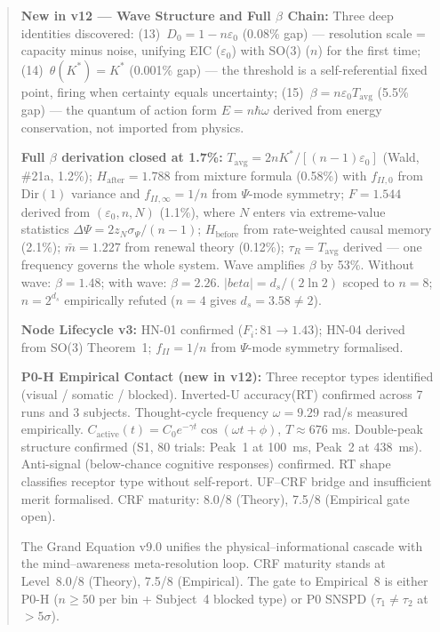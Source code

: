 \documentclass[12pt, a4paper]{article}
\begin{document}
\begin{abstract}
\textbf{New in v12 --- Wave Structure and Full $\beta$ Chain:}
Three deep identities discovered:
(13)~$D_0 = 1 - n\varepsilon_0$ (0.08\% gap) --- resolution scale = capacity minus noise,
unifying EIC ($\varepsilon_0$) with SO(3) ($n$) for the first time;
(14)~$\theta(K^*) = K^*$ (0.001\% gap) --- the threshold is a self-referential fixed point,
firing when certainty equals uncertainty;
(15)~$\beta = n\varepsilon_0 T_{\mathrm{avg}}$ (5.5\% gap) --- the quantum of action form
$E = n\hbar\omega$ derived from energy conservation, not imported from physics.

\textbf{Full $\beta$ derivation closed at 1.7\%:}
$T_{\mathrm{avg}} = 2nK^*/[(n-1)\varepsilon_0]$ (Wald, \#21a, 1.2\%);
$H_{\mathrm{after}} = 1.788$ from mixture formula (0.58\%) with $f_{II,0}$ from
$\mathrm{Dir}(1)$ variance and $f_{II,\infty} = 1/n$ from $\Psi$-mode symmetry;
$F = 1.544$ derived from $(\varepsilon_0, n, N)$ (1.1\%), where $N$ enters via
extreme-value statistics $\Delta\Psi = 2z_N\sigma_\Psi/(n-1)$;
$H_{\mathrm{before}}$ from rate-weighted causal memory (2.1\%);
$\bar{m} = 1.227$ from renewal theory (0.12\%);
$\tau_R = T_{\mathrm{avg}}$ derived --- one frequency governs the whole system.
Wave amplifies $\beta$ by 53\%. Without wave: $\beta = 1.48$; with wave: $\beta = 2.26$.
$|beta| = d_s/(2\ln 2)$ scoped to $n = 8$; $n = 2^{d_s}$ empirically refuted ($n = 4$
gives $d_s = 3.58 \neq 2$).

\textbf{Node Lifecycle v3:} HN-01 confirmed ($F_i: 81\to 1.43$); HN-04 derived from
SO(3) Theorem~1; $f_{II} = 1/n$ from $\Psi$-mode symmetry formalised.

\textbf{P0-H Empirical Contact (new in v12):} Three receptor types identified
(visual / somatic / blocked). Inverted-U accuracy(RT) confirmed across 7 runs and
3 subjects. Thought-cycle frequency $\omega = 9.29$ rad/s measured empirically.
$C_{\mathrm{active}}(t) = C_0 e^{-\gamma t}\cos(\omega t + \phi)$, $T \approx 676$ ms.
Double-peak structure confirmed (S1, 80 trials: Peak~1 at 100~ms, Peak~2 at 438~ms).
Anti-signal (below-chance cognitive responses) confirmed. RT shape classifies receptor
type without self-report. UF--CRF bridge and insufficient merit formalised.
CRF maturity: 8.0/8 (Theory), 7.5/8 (Empirical gate open).

The Grand Equation v9.0 unifies the physical--informational cascade with the mind--awareness
meta-resolution loop. CRF maturity stands at Level~8.0/8 (Theory), 7.5/8 (Empirical).
The gate to Empirical~8 is either P0-H ($n \geq 50$ per bin + Subject~4 blocked type)
or P0 SNSPD ($\tau_1 \neq \tau_2$ at $> 5\sigma$).


\end{abstract}
\end{document}
